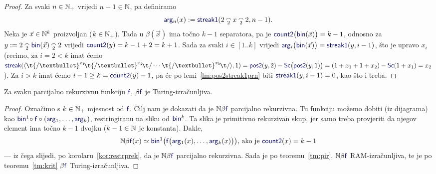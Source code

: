 \begin{proof}
Za svaki $n\in{\mathbb N}_+$ vrijedi $n-1\in{\mathbb N}$, pa definiramo
\begin{equation}
    \f{arg}_n(x):=\f{streak1}(2\conc2x\conc22,n-1)\text.
\end{equation}
Neka je $\vec x\in{\mathbb N}^k$ proizvoljan ($k\in{\mathbb N}_+$). Tada u $\beta(\vec x)$ ima točno $k-1$ separatora, pa je $\f{count2}\bigl(\f{bin}(\vec x)\bigr)=k-1$, odnosno za $y:=2\conc2\f{bin}(\vec x)\conc22$ vrijedi $\f{count2}(y)=k-1+2=k+1$. Sada za svaki $i\in[1..k]$ vrijedi $\f{arg}_i\bigl(\f{bin}(\vec x)\bigr)=\f{streak1}(y,i-1)$, što je upravo $x_i$ (recimo, za $i=2<k$ imat ćemo $\f{streak}(\kr{\t{/\textbullet}^{x_1}\!\t{/\textbullet}^{x_2}\!\t/\dotsm\t{/\textbullet}^{x_k}\!\t/},1)=\f{pos2}(y,2)-\f{Sc}\bigl(\f{pos2}(y,1)\bigr)=(1+x_1+1+x_2)-\f{Sc}(1+x_1)=x_2$).
Za $i>k$ imat ćemo $i-1\ge k=\f{count2}(y)-1$, pa će po lemi~\ref{lm:pos2streak1prn} biti $\f{streak1}(y,i-1)=0$, kao što i treba.
\end{proof}



\begin{teorem}[{name=[Turing-izračunljivost parcijalno rekurzivnih brojevnih funkcija]}]\label{tm:pibt}
Za svaku parcijalno rekurzivnu funkciju $\f f$, $\beta\f f$ je Turing-izračunljiva.
\end{teorem}
\begin{proof}
Označimo s $k\in{\mathbb N}_+$ mjesnost od $\f f$. Cilj nam je dokazati da je $\N\beta\f f$ parcijalno rekurzivna. Tu funkciju možemo dobiti (iz dijagrama) kao $\f{bin}^1\!\circ\f f\circ(\f{arg}_1,\dotsc,\f{arg}_k)$, restringiranu na sliku od $\f{bin}^k$. Ta slika je primitivno rekurzivan skup, jer samo treba provjeriti da njegov element ima točno $k-1$ dvojku ($k-1\in{\mathbb N}$ je konstanta).
Dakle,
\begin{equation}
\label{eq:defNbetaf}
    \N\beta\f f(x)\simeq\f{bin}^1\bigl(\f f\bigl(\f{arg}_1(x),\dotsc,\f{arg}_k(x)\bigr)\bigr)\text{, ako je }\f{count2}(x)=k-1
\end{equation}
--- iz čega slijedi, po korolaru~\ref{kor:restrprek}, da je $\N\beta\f f$ parcijalno rekurzivna. Sada je po teoremu~\ref{tm:pir}, $\N\beta\f f$ RAM-izračunljiva, te je po teoremu~\ref{tm:krit} $\beta\f f$ Turing-iz\-rač\-un\-lji\-va.
\end{proof}

